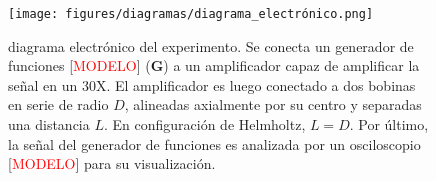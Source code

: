 \begin{figure}[H]
    \centering
    \texttt{[image: figures/diagramas/diagrama\_electrónico.png]}
    \caption{diagrama electrónico del experimento.
    Se conecta un generador de funciones [\textcolor{red}{MODELO}] ($\textbf{G}$) a un amplificador capaz de amplificar la señal en un $30\text{X}$. 
    El amplificador es luego conectado a dos bobinas en serie de radio $D$, alineadas axialmente por su centro y separadas una distancia $L$. En configuración de Helmholtz, $L=D$. 
    Por último, la señal del generador de funciones es analizada por un osciloscopio [\textcolor{red}{MODELO}] para su visualización.}
    \label{fig:esquema}
\end{figure}
